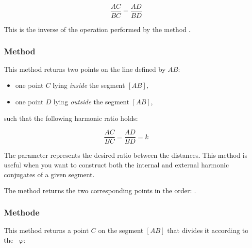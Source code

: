 \[
\frac{AC}{BC} = \frac{AD}{BD}
\]

\noindent
This is the inverse of the operation performed by the method .

\subsubsection{Method }
\label{ssub:harmonic_both}

This method returns two points on the line defined by $AB$:

\begin{itemize}
  \item one point $C$ lying \emph{inside} the segment $[AB]$,
  \item one point $D$ lying \emph{outside} the segment $[AB]$,
\end{itemize}

\noindent such that the following harmonic ratio holds:

\[
\frac{AC}{BC} = \frac{AD}{BD} = k
\]

\noindent
The parameter  represents the desired ratio between the distances. This method is useful when you want to construct both the internal and external harmonic conjugates of a given segment.

\medskip
\noindent
The method returns the two corresponding points in the order: .

\vspace{2em}
\begin{tkzexample}
\begin{center}
\end{center}

\end{tkzexample}

\subsubsection{Methode }
\label{ssub:methode_imeth_line_gold__ratio}

This method returns a point $C$ on the segment $[AB]$ that divides it according to the ~$\varphi$:

